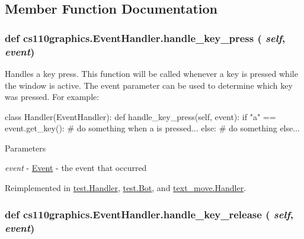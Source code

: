 \subsection{Member Function Documentation}
\hypertarget{classcs110graphics_1_1EventHandler_af3fb3531d0b23f1430a830586cd07906}{
\subsubsection[{handle\_\-key\_\-press}]{\setlength{\rightskip}{0pt plus 5cm}def cs110graphics.EventHandler.handle\_\-key\_\-press ( {\em self}, \/   {\em event})}}
\label{classcs110graphics_1_1EventHandler_af3fb3531d0b23f1430a830586cd07906}


Handles a key press. This function will be called whenever a key is pressed while the window is active. The event parameter can be used to determine which key was pressed. For example: 
\begin{DoxyCode}
 class Handler(EventHandler):
     def handle_key_press(self, event):
         if "a" == event.get_key():
             # do something when a is pressed...
         else:
             # do something else...
\end{DoxyCode}
 
\begin{DoxyParams}{Parameters}
\item[{\em event}]-\/ \hyperlink{classcs110graphics_1_1Event}{Event} -\/ the event that occurred \end{DoxyParams}


Reimplemented in \hyperlink{classtest_1_1Handler_a3d418670cfafce344b8b7155b4df438e}{test.Handler}, \hyperlink{classtest_1_1Bot_a23b90152ec8fa124851cd5fe6944beed}{test.Bot}, and \hyperlink{classtext__move_1_1Handler_a5a42b4eb6df32fce14be58a45a7a82f0}{text\_\-move.Handler}.\hypertarget{classcs110graphics_1_1EventHandler_a2849f60251baa44252992162521f2473}{
\subsubsection[{handle\_\-key\_\-release}]{\setlength{\rightskip}{0pt plus 5cm}def cs110graphics.EventHandler.handle\_\-key\_\-release ( {\em self}, \/   {\em event})}}
\label{classcs110graphics_1_1EventHandler_a2849f60251baa44252992162521f2473}


